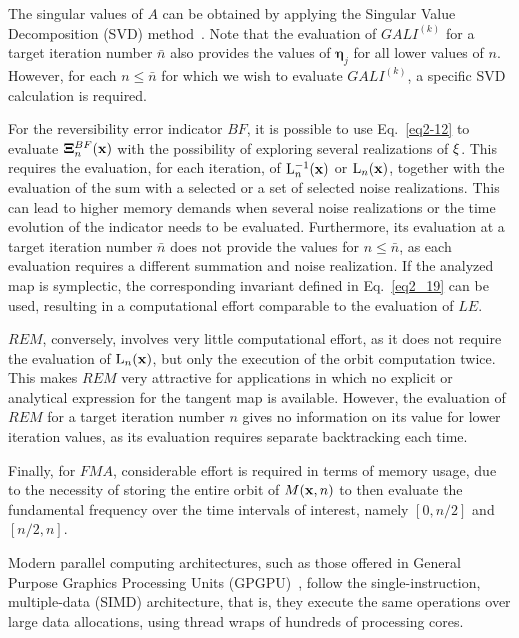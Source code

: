 \begin{chapterappendices}{}
The singular values of $A$ can be obtained by applying the Singular Value Decomposition (SVD) method~\cite{10.5555/1403886}. Note that the evaluation of $GALI^{(k)}$ for a target iteration number $\bar{n}$ also provides the values of $\boldsymbol{\eta}_j$ for all lower values of $n$. However, for each $n \leq \bar{n}$ for which we wish to evaluate $GALI^{(k)}$, a specific SVD calculation is required.

For the reversibility error indicator $BF$, it is possible to use Eq.~\eqref{eq2-12} to evaluate $\boldsymbol{\Xi}_{n}^{BF}(\vb{x})$ with the possibility of exploring several realizations of $\vb{\xi}$. This requires the evaluation, for each iteration, of $\mathrm{L}_n^{-1}(\vb{x})$ or $\mathrm{L}_n(\vb{x})$, together with the evaluation of the sum with a selected or a set of selected noise realizations. This can lead to higher memory demands when several noise realizations or the time evolution of the indicator needs to be evaluated. Furthermore, its evaluation at a target iteration number $\bar{n}$ does not provide the values for $n \leq \bar{n}$, as each evaluation requires a different summation and noise realization. If the analyzed map is symplectic, the corresponding invariant defined in Eq.~\eqref{eq2_19} can be used, resulting in a computational effort comparable to the evaluation of $LE$.

$REM$, conversely, involves very little computational effort, as it does not require the evaluation of $\mathrm{L}_n(\vb{x})$, but only the execution of the orbit computation twice. This makes $REM$ very attractive for applications in which no explicit or analytical expression for the tangent map is available. However, the evaluation of $REM$ for a target iteration number $n$ gives no information on its value for lower iteration values, as its evaluation requires separate backtracking each time.

Finally, for $FMA$, considerable effort is required in terms of memory usage, due to the necessity of storing the entire orbit of $M(\vb{x}, n)$ to then evaluate the fundamental frequency over the time intervals of interest, namely $[0, n/2]$ and $[n/2, n]$. 

Modern parallel computing architectures, such as those offered in General Purpose Graphics Processing Units (GPGPU)~\cite{DBLP:journals/corr/abs-1202-4347}, follow the single-instruction, multiple-data (SIMD) architecture, that is, they execute the same operations over large data allocations, using thread wraps of hundreds of processing cores.


\end{chapterappendices}
